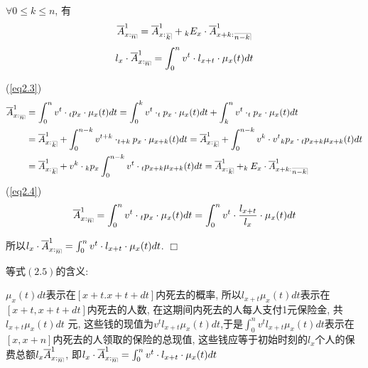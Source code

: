 \documentclass[a4paper,10pt]{ctexbook}
\makeatletter
\def\qed{\hfill$\Box$\medskip}
\DeclareRobustCommand{\annu}[1]{_{%
    \def\arraystretch{0}%
    \setlength\arraycolsep{1pt}%
    \setlength\arrayrulewidth{.2pt}%
    \begin{array}[b]{@{}c|}\hline
        \\[\arraycolsep]%
        \scriptstyle #1%
    \end{array}%
}}
\makeatother
\begin{document}
\begin{proposition}
    $\forall 0\leqslant k\leqslant n$, 有
    \begin{align}\label{eq2.3}
        \overline{A}_{x:\annu{n}}^1=\overline{A}_{x:}^1{}_{\annu k}+{}_kE_x\cdot\overline{A}_{x+k:}^1{}_{\annu {n-k}}
    \end{align}
    \begin{align}\label{eq2.4}
        l_x\cdot\overline{A}_{x:\annu{n}}^1=\int_0^{n}{v^{t}\cdot l_{x+t}\cdot \mu_{x}(t)dt}
    \end{align}
\end{proposition}


\proof
(\ref{eq2.3})
\begin{align*}
    \overline{A}_{x:\annu{n}}^1 & =\int_0^{n}{v^{t}\cdot{}_tp_x\cdot \mu_{x}(t)dt} = \int_0^{k}{v^{t}\cdot  _tp_x\cdot \mu_{x}(t)dt} +\int_k^{n}{v^{t}\cdot  _tp_x\cdot \mu_{x}(t)dt}                                                     \\
                                & = \overline{A}_{x:}^1{}_{\annu k} +\int_0^{n-k}{v^{t+k}\cdot  _{t+k}p_x\cdot \mu_{x+k}(t)dt}= \overline{A}_{x:}^1{}_{\annu k} +\int_0^{n-k}{v^{k}\cdot v^{t} {}_{k}p_x\cdot{}_{t}p_{x+k}\mu_{x+k}(t)dt} \\
                                & =\overline{A}_{x:}^1{}_{\annu k} +v^{k}\cdot {}_{k}p_x\int_0^{n-k}{ v^{t} \cdot{}_{t}p_{x+k}\mu_{x+k}(t)dt}=\overline{A}_{x:}^1{}_{\annu k}+_kE_x\cdot\overline{A}_{x+k:}^1{}_{\annu{n-k}}              \\
\end{align*}
(\ref{eq2.4})
$$\overline{A}_{x:\annu{n}}^1=\int_0^{n}{v^{t}\cdot{}_tp_x\cdot \mu_{x}(t)dt}=\int_0^{n}{v^{t}\cdot \frac{l_{x+t}}{l_x}\cdot \mu_{x}(t)dt}$$

所以$l_x\cdot\overline{A}_{x:\annu{n}}^1=\int_0^{n}{v^{t}\cdot l_{x+t}\cdot \mu_{x}(t)dt}$.
\qed
\begin{remark}等式$(2.5)$的含义:

    $\mu_x(t)dt$表示在$[x+t.x+t+dt]$内死去的概率, 所以$l_{x+t}\mu_x(t)dt$表示在$[x+t,x+t+dt]$内死去的人数, 在这期间内死去的人每人支付1元保险金, 共$l_{x+t}\mu_x(t)dt$ 元, 这些钱的现值为$v^t l_{x+t}\mu_x(t)dt$,于是$\int_0^n{v^t l_{x+t}\mu_x(t)dt}$表示在$[x,x+n]$内死去的人领取的保险的总现值, 这些钱应等于初始时刻的$l_x$个人的保费总额$l_x\overline{A}_{x:\annu{n}}^1$, 即$l_x\cdot\overline{A}_{x:\annu{n}}^1=\int_0^{n}{v^{t}\cdot l_{x+t}\cdot \mu_{x}(t)dt}$

\end{remark}
\end{document}

